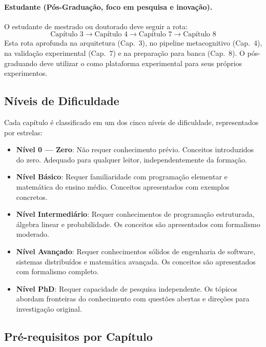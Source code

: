 \paragraph*{Estudante (Pós-Graduação, foco em pesquisa e inovação).}
O estudante de mestrado ou doutorado deve seguir a rota:
\[
\text{Capítulo 3} \to \text{Capítulo 4} \to \text{Capítulo 7} \to
\text{Capítulo 8}
\]
Esta rota aprofunda na arquitetura (Cap.~3), no pipeline metacognitivo
(Cap.~4), na validação experimental (Cap.~7) e na preparação para banca
(Cap.~8). O pós-graduando deve utilizar o \opencodeeco{} como plataforma
experimental para seus próprios experimentos.

\subsection{Níveis de Dificuldade}

Cada capítulo é classificado em um dos cinco níveis de dificuldade,
representados por estrelas:

\begin{itemize}
  \item \nivelzero \quad \textbf{Nível 0 --- Zero}: Não requer
        conhecimento prévio. Conceitos introduzidos do zero. Adequado para
        qualquer leitor, independentemente da formação.
  \item \nivelbasico \quad \textbf{Nível Básico}: Requer familiaridade com
        programação elementar e matemática do ensino médio. Conceitos
        apresentados com exemplos concretos.
  \item \nivelintermediario \quad \textbf{Nível Intermediário}: Requer
        conhecimentos de programação estruturada, álgebra linear e
        probabilidade. Os conceitos são apresentados com formalismo
        moderado.
  \item \nivelavancado \quad \textbf{Nível Avançado}: Requer conhecimentos
        sólidos de engenharia de software, sistemas distribuídos e
        matemática avançada. Os conceitos são apresentados com formalismo
        completo.
  \item \nivelphd \quad \textbf{Nível PhD}: Requer capacidade de pesquisa
        independente. Os tópicos abordam fronteiras do conhecimento com
        questões abertas e direções para investigação original.
\end{itemize}

\subsection{Pré-requisitos por Capítulo}

